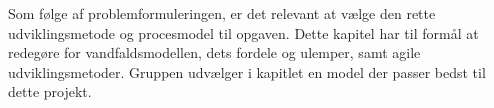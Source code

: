 Som følge af problemformuleringen, er det relevant at vælge den rette udviklingsmetode og procesmodel til opgaven.
Dette kapitel har til formål at redegøre for vandfaldsmodellen, dets fordele og ulemper, samt agile udviklingsmetoder.
Gruppen udvælger i kapitlet en model der passer bedst til dette projekt.